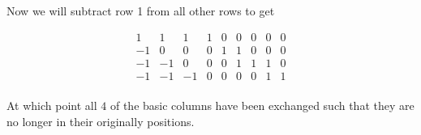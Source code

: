 \documentclass[12pt]{amsart}
\theoremstyle{definition}
\begin{document}
\begin{itemize}
Now we will subtract row 1 from all other rows to get 

\[
 \boxed{\begin{matrix}
1   & 1  &   1 &   1 &    0 &    0 &    0 &    0 &    0\\
-1  &  0 &   0 &   0 &    1 &    1 &   0  &    0 &    0\\
-1  & -1 &   0 &   0 &    0 &    1 &    1 &    1 &    0\\
-1  & -1 &  -1 &   0 &    0 &    0 &    0 &    1 &    1
\end{matrix}}
\]\\


At which point all $4$ of the basic columns have been exchanged such that they are no longer in their originally positions.

\end{itemize}
\end{document}
